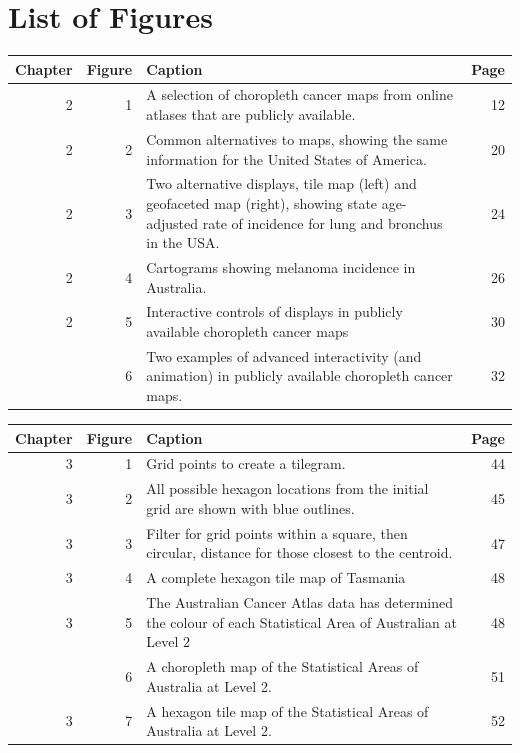 \documentclass{monashthesis}
\begin{document}
\newpage

\hypertarget{list-of-figures}{%
\chapter*{List of Figures}\label{list-of-figures}}

\begin{tabular}{rr>{\raggedright\arraybackslash}p{25em}r}
\toprule
Chapter & Figure & Caption & Page\\
\midrule
2 & 1 & A selection of choropleth cancer maps from online atlases that are publicly available. & 12\\
2 & 2 & Common alternatives to maps, showing the same information for the United States of America. & 20\\
2 & 3 & Two alternative displays, tile map (left) and geofaceted map (right), showing state age-adjusted rate of incidence for lung and bronchus in the USA. & 24\\
2 & 4 & Cartograms showing melanoma incidence in Australia. & 26\\
2 & 5 & Interactive controls of displays in publicly available choropleth cancer maps & 30\\
\addlinespace
2 & 6 & Two examples of advanced interactivity (and animation) in publicly available choropleth cancer maps. & 32\\
\bottomrule
\end{tabular}

\begin{tabular}{rr>{\raggedright\arraybackslash}p{25em}r}
\toprule
Chapter & Figure & Caption & Page\\
\midrule
3 & 1 & Grid points to create a tilegram. & 44\\
3 & 2 & All possible hexagon locations from the initial grid are shown with blue outlines. & 45\\
3 & 3 & Filter for grid points within a square, then circular, distance for those closest to the centroid. & 47\\
3 & 4 & A complete hexagon tile map of Tasmania & 48\\
3 & 5 & The Australian Cancer Atlas data has determined the colour of each Statistical Area of Australian at Level 2 & 48\\
\addlinespace
3 & 6 & A choropleth map of the Statistical Areas of Australia at Level 2. & 51\\
3 & 7 & A hexagon tile map of the Statistical Areas of Australia at Level 2. & 52\\
\bottomrule
\end{tabular}
\end{document}

